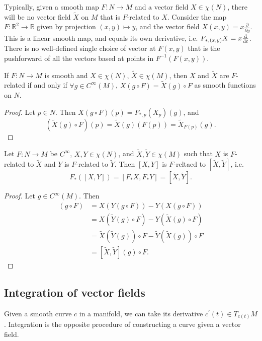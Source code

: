 Typically, given a smooth map $F: N \to M$ and a vector field
$X \in \chi(N)$, there will be no vector field $\tilde{X}$ on $M$ that
is $F$-related to $X$. Consider the map $F: \mathbb{R}^2 \to
\mathbb{R}$ given by projection $(x, y) \mapsto y$,
and the vector field $X(x, y) = x \frac{\partial}{\partial y}$. This
is a linear smooth map, and equals its own derivative, i.e.
$F_{\ast, (x, y)} X = x \frac{\mathop{}\!\mathrm{d}}{\mathop{}\!\mathrm{d} t}$. There is no well-defined
single choice of vector at $F(x, y)$ that is the pushforward of all
the vectors based at points in $F^{-1}(F(x, y))$.

\begin{prop}
If $F: N \to M$ is smooth and $X \in \chi(N)$, $\tilde{X} \in
\chi(M)$, then $X$ and $\tilde{X}$ are $F$-related if and only if
$\forall g \in C^\infty(M)$,
$X(g \circ F) = \tilde{X}(g) \circ F$ as smooth functions on $N$.
\end{prop}
\begin{proof}
Let $p \in N$. Then
$X(g \circ F)(p) = F_{\ast, p}(X_p)(g)$, and
$$
  (\tilde{X}(g) \circ F)(p)
= \tilde{X}(g)(F(p))
= \tilde{X}_{F(p)}(g).
$$
\end{proof}

\begin{prop}
Let $F: N \to M$ be $C^\infty$, $X, Y \in \chi(N)$,
and $\tilde{X}, \tilde{Y} \in \chi(M)$ such that
$X$ is $F$-related to $\tilde{X}$ and $Y$ is $F$-related to
$\tilde{Y}$.
Then $[X, Y]$ is $F$-reltaed to $[\tilde{X}, \tilde{Y}]$, i.e.
$$
F_\ast([X, Y]) = [F_\ast X, F_\ast Y] = [\tilde{X}, \tilde{Y}].
$$
\end{prop}
\begin{proof}
Let $g \in C^\infty(M)$. Then
\begin{align*}
   [X, Y](g \circ F)
&= X(Y(g \circ F)) - Y(X(g \circ F)) \\
&= X(\tilde{Y}(g) \circ F) - Y(\tilde{X}(g) \circ F) \\
&= \tilde{X}(\tilde{Y}(g)) \circ F
 - \tilde{Y}(\tilde{X}(g)) \circ F \\
&= [\tilde{X}, \tilde{Y}](g) \circ F.
\end{align*}
\end{proof}

\subsection{Integration of vector fields}
Given a smooth curve $c$ in a manifold, we can take its derivative
$c^\prime(t) \in T_{c(t)} M$. Integration is the opposite procedure of
constructing a curve given a vector field.

